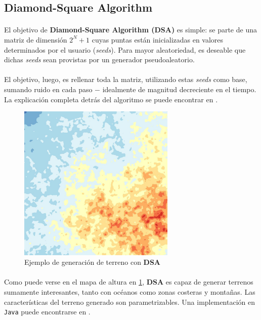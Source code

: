 \documentclass[12pt, twocolumn]{article}
\begin{document}
	\subsection{Diamond-Square Algorithm}
	
	\paragraph{} El objetivo de \textbf{Diamond-Square Algorithm (DSA)} es simple: se parte de una matriz de dimensión $2^{N} + 1$ cuyas puntas están inicializadas en valores determinados por el usuario (\textit{seeds}). Para mayor aleatoriedad, es deseable que dichas \textit{seeds} sean provistas por un generador pseudoaleatorio. 
	
	\paragraph{} El objetivo, luego, es rellenar toda la matriz, utilizando estas \textit{seeds} como base, sumando ruido en cada paso $-$ idealmente de magnitud decreciente en el tiempo. La explicación completa detrás del algoritmo se puede encontrar en \cite{dsa}.
	
	\begin{figure}[H]
		\centering
		\includegraphics[width=7.5cm]{../results/other_terrains/Heightmap_dsa.jpg}
		\caption{Ejemplo de generación de terreno con \textbf{DSA}}
		\label{dsaimg}
	\end{figure}
	
	\paragraph{} Como puede verse en el mapa de altura en \ref{dsaimg}, \textbf{DSA} es capaz de generar terrenos sumamente interesantes, tanto con océanos como zonas costeras y montañas. Las características del terreno generado son parametrizables. Una implementación en \verb|Java| puede encontrarse en \cite{dsai}. 
	
\end{document}

